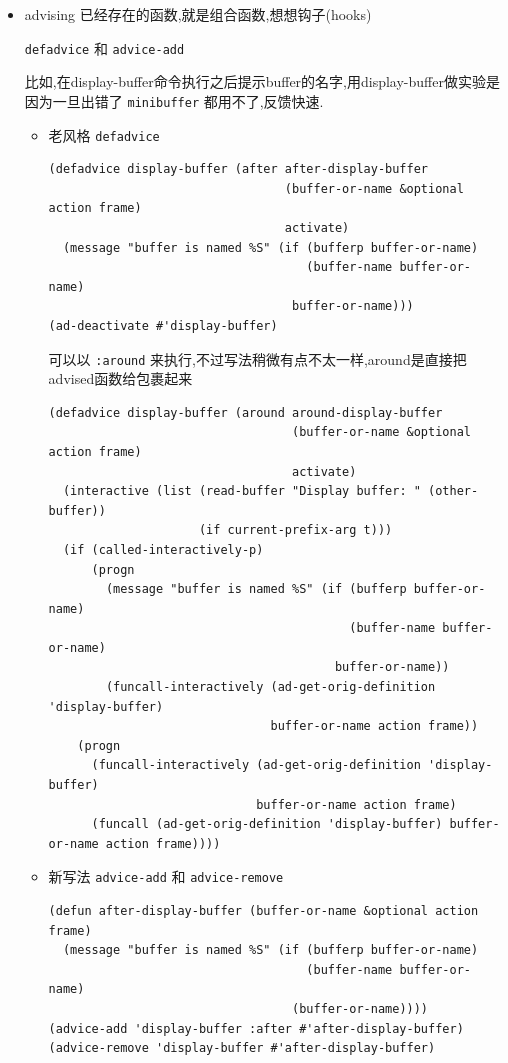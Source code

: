 \documentclass[11pt]{article}
\begin{document}
\begin{itemize}
\item advising 已经存在的函数,就是组合函数,想想钩子(hooks)

\texttt{defadvice} 和 \texttt{advice-add}

比如,在display-buffer命令执行之后提示buffer的名字,用display-buffer做实验是因为一旦出错了 \texttt{minibuffer} 都用不了,反馈快速.

\begin{itemize}
\item 老风格 \texttt{defadvice}

\begin{verbatim}
(defadvice display-buffer (after after-display-buffer
                                 (buffer-or-name &optional action frame)
                                 activate)
  (message "buffer is named %S" (if (bufferp buffer-or-name)
                                    (buffer-name buffer-or-name)
                                  buffer-or-name)))
(ad-deactivate #'display-buffer)
\end{verbatim}

可以以 \texttt{:around} 来执行,不过写法稍微有点不太一样,around是直接把advised函数给包裹起来

\begin{verbatim}
(defadvice display-buffer (around around-display-buffer
                                  (buffer-or-name &optional action frame)
                                  activate)
  (interactive (list (read-buffer "Display buffer: " (other-buffer))
                     (if current-prefix-arg t)))
  (if (called-interactively-p)
      (progn
        (message "buffer is named %S" (if (bufferp buffer-or-name)
                                          (buffer-name buffer-or-name)
                                        buffer-or-name))
        (funcall-interactively (ad-get-orig-definition 'display-buffer)
                               buffer-or-name action frame))
    (progn
      (funcall-interactively (ad-get-orig-definition 'display-buffer)
                             buffer-or-name action frame)
      (funcall (ad-get-orig-definition 'display-buffer) buffer-or-name action frame))))
\end{verbatim}

\item 新写法 \texttt{advice-add} 和 \texttt{advice-remove}

\begin{verbatim}
(defun after-display-buffer (buffer-or-name &optional action frame)
  (message "buffer is named %S" (if (bufferp buffer-or-name)
                                    (buffer-name buffer-or-name)
                                  (buffer-or-name))))
(advice-add 'display-buffer :after #'after-display-buffer)
(advice-remove 'display-buffer #'after-display-buffer)
\end{verbatim}


\end{itemize}
\end{itemize}
\end{document}
